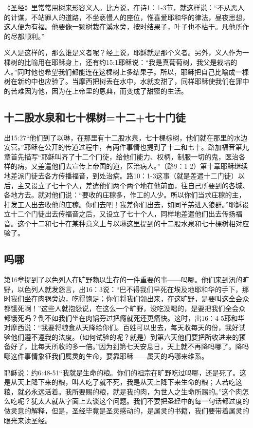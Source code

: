 《圣经》里常常用树来形容义人。比方说，在诗1：1-3节，就这样说：“不从恶人的计谋，不站罪人的道路，不坐亵慢人的座位，惟喜爱耶和华的律法，昼夜思想，这人便为有福。他要像一颗树栽在溪水旁，按时结果子，叶子也不枯干。凡他所作的尽都顺利。”

义人是这样的，那么谁是义者呢？经上说，耶稣就是那个义者。另外，义人作为一棵树的比喻用在耶稣身上，还有约15:1耶稣说：“我是真葡萄树，我父是栽培的人。”同时他也希望我们都能连在这棵树上多结果子。所以，耶稣把自己比喻成一棵树在新约中也应验了。当摩西把树丢在水中，水就变甜了，同样耶稣使我们在罪中的苦难因为他，因为在上帝里的恩典，而变成了甜蜜的生活。

\subsection{十二股水泉和七十棵树=十二+七十门徒}
出15:27“他们到了以琳，在那里有十二股水泉，七十棵棕树，他们就在那里的水边安营。”耶稣在公开的传道过程中，有两件事情也提到了十二和七十。路加福音第九章首先描写“耶稣叫齐了十二个门徒，给他们能力、权柄，制服一切的鬼，医治各样的病，又差遣他们去宣传上帝国的道，医治病人。”（路9：1-2）第十章耶稣继续地差派门徒去各方传播福音，到处治病。路10：1-3这事（就是差遣十二门徒）以后，主又设立了七十个人，差遣他们两个两个地在他前面，往自己所要到的各城、各地方去。就对他们说：“要收的庄稼多，作工的人少。所以你们当求庄稼的主，打发工人出去收他的庄稼。你们去吧！我差你们出去，如同羊羔进入狼群。”耶稣设立十二个门徒出去传福音之后，又设立了七十个人，同样地差遣他们出去传扬福音。这个十二和七十在某种意义上与以琳这里提到的十二股水泉和七十棵树相对应验了。

\subsection{吗哪}
第16章提到了以色列人在旷野赖以生存的一件重要的事——吗哪。他们来到汛的旷野，以色列人就发怨言，出16：3说：“巴不得我们早死在埃及地耶和华的手下，那时我们坐在肉锅旁边，吃得饱足；你们将我们领出来，在这旷野，是要叫这全会众都饿死啊！”这些人就抱怨说，在这么一个旷野，没吃没喝的，是要把我们全会众都饿死吗？倒不如我们坐在肉锅旁过把瘾就死还更痛快。这时，出16：4-5耶和华对摩西说：“我要将粮食从天降给你们。百姓可以出去，每天收每天的份，我好试验他们遵不遵我的法度。（如何试验的呢？就是）到第六天他们要把所收进来的预备好了，比每天所收的多一倍。”因为到第七天安息日，天上就不再降吗哪了。降吗哪这件事情象征我们属灵的生命，要靠耶稣——属天的吗哪来维系。

耶稣说：约6:48-51“我就是生命的粮。你们的祖宗在旷野吃过吗哪，还是死了。这是从天上降下来的粮，叫人吃了就不死，我是从天上降下来生命的粮；人若吃这粮，就必永远活着。我所要赐的粮，就是我的肉，为世人之生命所赐的。”这个肉怎么吃呢？犹太人就从字面上去谈这个问题。我们不要把圣经中的每一句话都过度的做灵意的解释，但是，圣经毕竟是圣灵感动的，是属灵的书籍，我们要带着属灵的眼光来读圣经。

